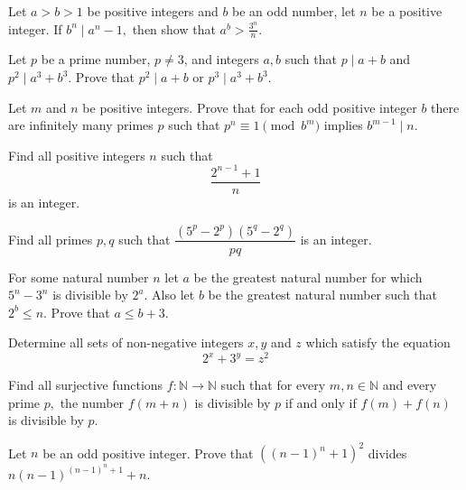 \documentclass[problems.tex]{subfile}
\begin{document}
	\begin{problem}
		Let $ a > b > 1$ be positive integers and $b$ be an odd number, let $ n$ be a positive integer. If $ b^n \mid a^n-1,$ then show that $ a^b > \frac {3^n}{n}.$
	\end{problem}

	\begin{problem}
		Let $ p$ be a prime number, $ p\neq 3$, and integers $ a,b$ such that $ p\mid a + b$ and $ p^2 \mid a^3 + b^3$. Prove that $ p^2 \mid a + b$ or $ p^3 \mid a^3 + b^3$.
	\end{problem}

	\begin{problem}
		Let $m$ and $n$ be positive integers. Prove that for each odd positive integer $b$ there are infinitely many primes $p$ such that $p^n \equiv 1 \pmod{b^m}$ implies $b^{m-1} \mid n.$
	\end{problem}

	\begin{problem}
		Find all positive integers $n$ such that
		\[\frac{2^{n-1}+1}{n}\]
		is an integer.
	\end{problem}

	\begin{problem}
		Find all primes $p,q$ such that $\dfrac{(5^p-2^p)(5^q-2^q)}{pq}$ is an integer.
	\end{problem}

	\begin{problem}
		For some natural number $n$ let $a$ be the greatest natural number for which $5^{n}-3^{n}$ is divisible by $2^{a}$. Also let $b$ be the greatest natural number such that $2^{b} \leq n$. Prove that $a \leq b+3$.
	\end{problem}


	\begin{problem}
		Determine all sets of non-negative integers $ x, y$ and $ z$ which satisfy the equation
		\[
			2^{x}+3^{y}=z^{2}
		\]
	\end{problem}

	\begin{problem}
		Find all surjective functions $ f: \mathbb{N} \to \mathbb{N}$ such that for every $ m,n \in \mathbb{N}$ and every prime $ p,$ the number $ f(m + n)$ is divisible by $ p$ if and only if $ f(m)+ f(n)$ is divisible by $ p.$
	\end{problem}

	\begin{problem}
		Let $ n$ be an odd positive integer. Prove that $((n-1)^n+1)^2$ divides $ n(n-1)^{(n-1)^n+1}+n$.
	\end{problem}
\end{document}
